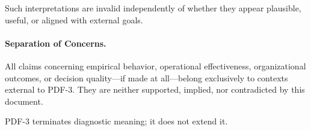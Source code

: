 Such interpretations are invalid independently of whether they appear
plausible, useful, or aligned with external goals.

\paragraph{Separation of Concerns.}
All claims concerning empirical behavior, operational effectiveness,
organizational outcomes, or decision quality—if made at all—belong exclusively
to contexts external to PDF-3.
They are neither supported, implied, nor contradicted by this document.

PDF-3 terminates diagnostic meaning; it does not extend it.
